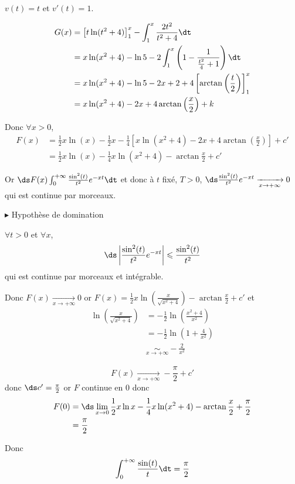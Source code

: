 \begin{exemple}
    $v(t) = t$ et $v'(t) = 1$.

    \begin{align}
        G(x) & = \left[ t \ln(t^2 + 4) \right]_1^x - \int_1^x \frac{2t^2}{t^2 + 4} \dt \\
        & = x \ln(x^2 + 4) - \ln 5 - 2 \int_1^x \left( 1 - \frac 1 {\frac{t^2}{4} + 1} \right) \dt \\
        & = x \ln(x^2 + 4) - \ln 5 - 2x + 2  + 4 \left[ \arctan \left( \frac t 2 \right) \right]_1^x \\
        & = x \ln(x^2 + 4) - 2x + 4 \arctan \left( \frac x 2 \right) + k
    \end{align}

    Donc $\forall x > 0$, 
    \begin{align}
        F(x) & = \frac 1 2 x \ln(x) - \frac 1 2 x - \frac 1 4 \left[ x \ln(x^2 + 4) - 2x + 4 \arctan \left( \frac x 2 \right) \right] + c' \\
        & = \frac 1 2 x \ln(x) - \frac 1 4 x \ln(x^2 + 4) -  \arctan \frac x 2 + c'
    \end{align}

    Or $\ds F(x) \int_{0}^{+ \infty} \frac{\sin^2(t)}{t^2} e^{-xt} \dt$ 
    et donc à $t$ fixé, $T > 0$, $\ds \frac{\sin^2(t)}{t^2} e^{-xt} \xrightarrow[x \to + \infty]{} 0$ qui est continue par morceaux.

    \avspace $\blacktriangleright$ Hypothèse de domination

    $\forall t > 0$ et $\forall x$, $$\ds \left| \frac{\sin^2(t)}{t^2}e^{-xt} \right| \leqslant \frac{\sin^2(t)}{t^2}$$ qui est continue par morceaux et intégrable.

    Donc $F(x) \xrightarrow[x \to + \infty]{} 0$ or $F(x) = \frac 1 2x \ln\left( \frac{x}{\sqrt{x^2 + 4}}\right) - \arctan \frac x 2 + c'$
    et 
    \begin{align}
        \ln \left( \frac x {\sqrt{x^2 + 4}} \right) & = - \frac 1 2 \ln\left( \frac{x^2 + 4}{x^2} \right) \\
        & = - \frac 1 2 \ln\left( 1 + \frac 4 {x^2} \right) \\
        & \underset{x \to + \infty}{\sim} - \frac 2 {x^2}
    \end{align}

    $$F(x) \xrightarrow[x \to + \infty]{} - \frac \pi 2 + c'$$ donc $\ds c' = \frac \pi 2$ 
    or $F$ continue en $0$ donc 
    \begin{align}
        F(0) & = \ds \lim_{x \to 0} \frac 1 2 x \ln x - \frac 1 4 x \ln (x^2 + 4) - \arctan \frac x 2 + \frac \pi 2 \\
        & = \frac \pi 2
    \end{align}

    Donc 
    $$\int_0^{+ \infty} \frac{\sin(t)}{t} \dt = \frac \pi 2$$
\end{exemple}

